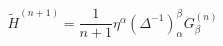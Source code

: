 \begin{equation}
 \tilde{H}^{(n+1)}=\frac{1}{n+1}\eta^\alpha(\Delta^{-1})_\alpha ^\beta G_\beta
 ^{(n)}
 \label{C5}
 \end{equation}

